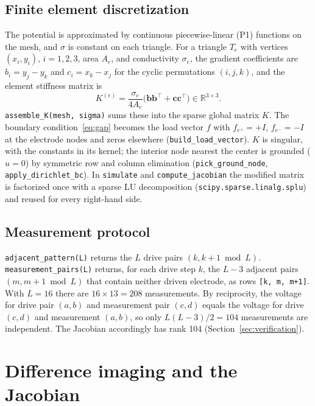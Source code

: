 \documentclass[11pt,a4paper]{article}
\newcommand{\code}[1]{\texttt{#1}}
\begin{document}
\subsection{Finite element discretization}

The potential is approximated by continuous piecewise-linear (P1) functions
on the mesh, and $\sigma$ is constant on each triangle. For a triangle $T_e$
with vertices $(x_i,y_i)$, $i=1,2,3$, area $A_e$, and conductivity
$\sigma_e$, the gradient coefficients are
$b_i = y_j - y_k$ and $c_i = x_k - x_j$ for the cyclic permutations
$(i,j,k)$, and the element stiffness matrix is
\begin{equation}\label{eq:element}
  K^{(e)} = \frac{\sigma_e}{4A_e}\bigl(\mathbf b\mathbf b^\top +
  \mathbf c\mathbf c^\top\bigr) \in\mathbb R^{3\times3} .
\end{equation}
\code{assemble\_K(mesh, sigma)} sums these into the sparse global matrix $K$.
The boundary condition~\eqref{eq:gap} becomes the load vector $f$ with
$f_{e^+}=+I$, $f_{e^-}=-I$ at the electrode nodes and zeros elsewhere
(\code{build\_load\_vector}). $K$ is singular, with the constants in its
kernel; the interior node nearest the center is grounded ($u=0$) by
symmetric row and column elimination (\code{pick\_ground\_node},
\code{apply\_dirichlet\_bc}). In \code{simulate} and \code{compute\_jacobian}
the modified matrix is factorized once with a sparse LU decomposition
(\code{scipy.sparse.linalg.splu}) and reused for every right-hand side.

\subsection{Measurement protocol}\label{sec:protocol}

\code{adjacent\_pattern(L)} returns the $L$ drive pairs $(k, k+1 \bmod L)$.
\code{measurement\_pairs(L)} returns, for each drive step $k$, the $L-3$
adjacent pairs $(m, m+1 \bmod L)$ that contain neither driven electrode, as
rows \code{[k, m, m+1]}. With $L=16$ there are $16\times13=208$ measurements.
By reciprocity, the voltage for drive pair $(a,b)$ and measurement pair
$(c,d)$ equals the voltage for drive $(c,d)$ and measurement $(a,b)$, so only
$L(L-3)/2 = 104$ measurements are independent. The Jacobian accordingly has
rank 104 (Section~\ref{sec:verification}).

\section{Difference imaging and the Jacobian}
\end{document}
